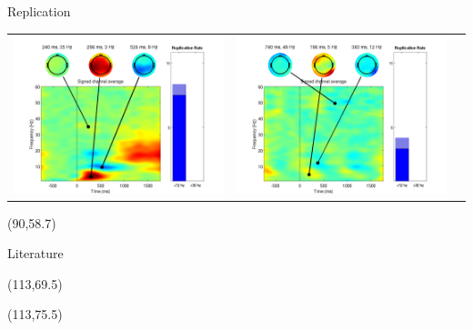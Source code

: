 \documentclass[final]{beamer}
\begin{document}
\begin{frame}{}
\begin{textblock}{70}
\begin{block}{Replication}
\begin{tabular}{c c c}
\includegraphics{gamma10} & \includegraphics{gamma11} &  \\
\end{tabular}
\end{block}
\end{textblock}


\begin{textblock}{27.5}(90,58.7)
\begin{block}{Literature}
\tiny


\end{block}
\end{textblock}

\begin{textblock}{10}(113,69.5)
\end{textblock}
\begin{textblock}{10}(113,75.5)
\end{textblock}

\end{frame}
\end{document}
